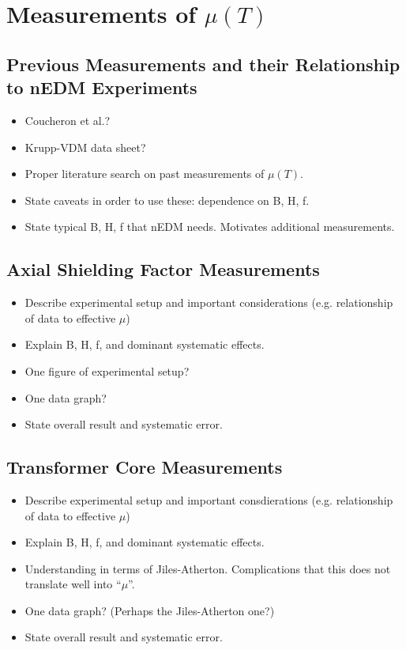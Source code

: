 \documentclass[review]{elsarticle}
\begin{document}
\section{Measurements of $\mu(T)$}

\subsection{Previous Measurements and their Relationship to nEDM Experiments}

\begin{itemize}
\item Coucheron et al.?
\item Krupp-VDM data sheet?
\item Proper literature search on past measurements of $\mu(T)$.
\item State caveats in order to use these:  dependence on B, H, f.
\item State typical B, H, f that nEDM needs.  Motivates additional
  measurements.
\end{itemize}

\subsection{Axial Shielding Factor Measurements}

\begin{itemize}
\item Describe experimental setup and important considerations
  (e.g. relationship of data to effective $\mu$)
\item Explain B, H, f, and dominant systematic effects.
\item One figure of experimental setup?
\item One data graph?
\item State overall result and systematic error.
\end{itemize}

\subsection{Transformer Core Measurements}

\begin{itemize}
\item Describe experimental setup and important consdierations (e.g. relationship of data to effective $\mu$)
\item Explain B, H, f, and dominant systematic effects.
\item Understanding in terms of Jiles-Atherton.  Complications that
  this does not translate well into ``$\mu$''.
\item One data graph?  (Perhaps the Jiles-Atherton one?)
\item State overall result and systematic error.
\end{itemize}
\end{document}
